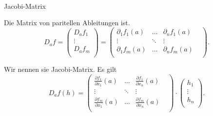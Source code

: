 \documentclass[class=article, crop=false]{standalone}
\begin{document}
\begin{zettel}{Jacobi-Matrix}
\begin{flashcard}[]{}
	\begin{definition}
		Die Matrix von paritellen Ableitungen ist.
		\[
			D_a f = \begin{pmatrix}
				D_a f_1 \\
				\vdots  \\
				D_a f_m \\
			\end{pmatrix}
			=
			\begin{pmatrix}
				\partial_1 f_1 (a) & \dots  & \partial _n f_1 (a)   \\
				\vdots             & \ddots & \vdots              & \\
				\partial_1 f_m (a) & \dots  & \partial_n f_m (a)    \\
			\end{pmatrix}
		.\]

		Wir nennen sie Jacobi-Matrix. Es gilt
		\[
			D_a f (h)=
			\begin{pmatrix}
				\frac{ \partial f_{1}}{\partial x_1} (a) & \dots  & \frac{ \partial f_{1}}{\partial x_n} (a)   \\
				\vdots                                   & \ddots & \vdots                                   & \\
				\frac{\partial f_{m}}{\partial x_1} (a)  & \dots  & \frac{\partial f_{m}}{\partial x_n} (a)    \\
			\end{pmatrix} \cdot
			\begin{pmatrix}
				h_1    \\
				\vdots \\
				h_n    \\
			\end{pmatrix}
		.\]
	\end{definition}

\end{flashcard}
\end{zettel}
\end{document}
